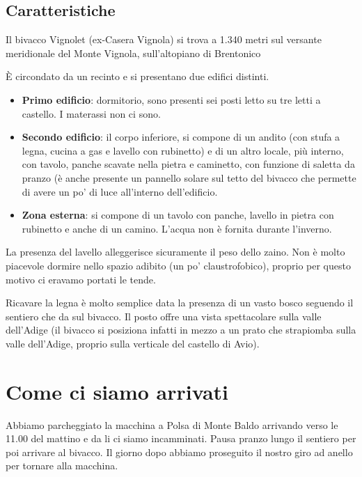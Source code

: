 \documentclass{article}
\begin{document}
\subsection{Caratteristiche}
Il bivacco Vignolet (ex-Casera Vignola) si trova a 1.340 metri sul versante meridionale del Monte Vignola, sull'altopiano di Brentonico

È circondato da un recinto e si presentano due edifici distinti.
\begin{itemize}
    \item \textbf{Primo edificio}: dormitorio, sono presenti sei posti letto su tre letti a castello. I materassi non ci sono.
    \item \textbf{Secondo edificio}: il corpo inferiore, si compone di un andito (con stufa a legna, cucina a gas e lavello con rubinetto) e di un altro locale, più interno, con tavolo, panche scavate nella pietra e caminetto, con funzione di saletta da pranzo (è anche presente un pannello solare sul tetto del bivacco che permette di avere un po' di luce all'interno dell'edificio.
    \item \textbf{Zona esterna}: si compone di un tavolo con panche, lavello in pietra con rubinetto e anche di un camino. L'acqua non è fornita durante l'inverno.
\end{itemize}

La presenza del lavello alleggerisce sicuramente il peso dello zaino. Non è molto piacevole dormire nello spazio adibito (un po' claustrofobico), proprio per questo motivo ci eravamo portati le tende.

Ricavare la legna è molto semplice data la presenza di un vasto bosco seguendo il sentiero che da sul bivacco. Il posto offre una vista spettacolare sulla valle dell'Adige (il bivacco si posiziona infatti in mezzo a un prato che strapiomba sulla valle dell'Adige, proprio sulla verticale del castello di Avio).

\section{Come ci siamo arrivati}
Abbiamo parcheggiato la macchina a Polsa di Monte Baldo arrivando verso le 11.00 del mattino e da li ci siamo incamminati. Pausa pranzo lungo il sentiero per poi arrivare al bivacco. Il giorno dopo abbiamo proseguito il nostro giro ad anello per tornare alla macchina.
\end{document}

